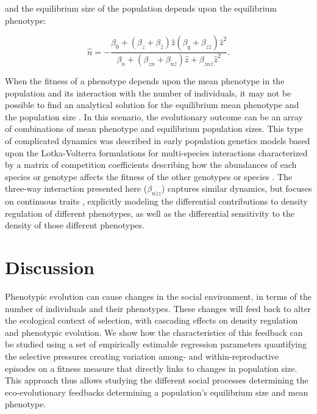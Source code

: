 \documentclass{article}
\begin{document}
	\noindent and the equilibrium size of the population depends upon the equilibrium phenotype:
	
	\begin{equation}  \label{eq: eq_N_S7}
	\hat{n} = -\frac{\beta_{0}+(\beta_{z}  +  \beta_{\bar{z}})\hat{z}  (\beta_{q} + \beta_{z\bar{z}})\hat{z}^2 }{\beta_{n} + (\beta_{zn} + \beta_{n\bar{z}}) \hat{z} + \beta_{zn\bar{z}}\hat{z}^2}.
	\end{equation}
	
	When the fitness of a phenotype depends upon the mean phenotype in the population and its interaction with the number of individuals, it may not be possible to find an analytical solution for the equilibrium mean phenotype and the population size \citep{Engen2020}. In this scenario, the evolutionary outcome can be an array of combinations of mean phenotype and equilibrium population sizes. This type of complicated dynamics was described in early population genetics models based upon the Lotka-Volterra formulations for multi-species interactions characterized by a matrix of competition coefficients describing how the abundances of each species or genotype affects the fitness of the other genotypes or species \citep{Clarke1972, Anderson1983}. The three-way interaction presented here ($\beta_{n\bar{z}z}$) captures similar dynamics, but focuses on continuous traits \citep{Engen2020}, explicitly modeling the differential contributions to density regulation of different phenotypes, as well as the differential sensitivity to the density of those different phenotypes.   
	

	\section{Discussion}
	Phenotypic evolution can cause changes in the social environment, in terms of the number of individuals and their phenotypes. These changes will feed back to alter the ecological context of selection, with cascading effects on density regulation and phenotypic evolution. We show how the characteristics of this feedback can be studied using a set of empirically estimable regression parameters quantifying the selective pressures creating variation among- and within-reproductive episodes on a fitness measure that directly links to changes in population size. This approach thus allows studying the different social processes determining the eco-evolutionary feedbacks determining a population's equilibrium size and mean phenotype. 
	
\end{document}
